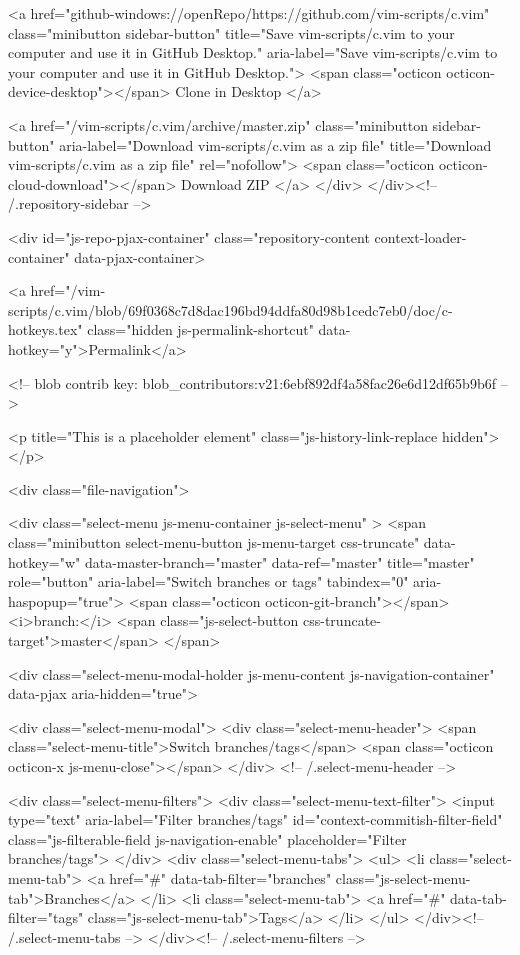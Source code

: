   <a href="github-windows://openRepo/https://github.com/vim-scripts/c.vim" class="minibutton sidebar-button" title="Save vim-scripts/c.vim to your computer and use it in GitHub Desktop." aria-label="Save vim-scripts/c.vim to your computer and use it in GitHub Desktop.">
    <span class="octicon octicon-device-desktop"></span>
    Clone in Desktop
  </a>

                <a href="/vim-scripts/c.vim/archive/master.zip"
                   class="minibutton sidebar-button"
                   aria-label="Download vim-scripts/c.vim as a zip file"
                   title="Download vim-scripts/c.vim as a zip file"
                   rel="nofollow">
                  <span class="octicon octicon-cloud-download"></span>
                  Download ZIP
                </a>
              </div>
        </div><!-- /.repository-sidebar -->

        <div id="js-repo-pjax-container" class="repository-content context-loader-container" data-pjax-container>
          


<a href="/vim-scripts/c.vim/blob/69f0368c7d8dac196bd94ddfa80d98b1cedc7eb0/doc/c-hotkeys.tex" class="hidden js-permalink-shortcut" data-hotkey="y">Permalink</a>

<!-- blob contrib key: blob_contributors:v21:6ebf892df4a58fac26e6d12df65b9b6f -->

<p title="This is a placeholder element" class="js-history-link-replace hidden"></p>

<div class="file-navigation">
  

<div class="select-menu js-menu-container js-select-menu" >
  <span class="minibutton select-menu-button js-menu-target css-truncate" data-hotkey="w"
    data-master-branch="master"
    data-ref="master"
    title="master"
    role="button" aria-label="Switch branches or tags" tabindex="0" aria-haspopup="true">
    <span class="octicon octicon-git-branch"></span>
    <i>branch:</i>
    <span class="js-select-button css-truncate-target">master</span>
  </span>

  <div class="select-menu-modal-holder js-menu-content js-navigation-container" data-pjax aria-hidden="true">

    <div class="select-menu-modal">
      <div class="select-menu-header">
        <span class="select-menu-title">Switch branches/tags</span>
        <span class="octicon octicon-x js-menu-close"></span>
      </div> <!-- /.select-menu-header -->

      <div class="select-menu-filters">
        <div class="select-menu-text-filter">
          <input type="text" aria-label="Filter branches/tags" id="context-commitish-filter-field" class="js-filterable-field js-navigation-enable" placeholder="Filter branches/tags">
        </div>
        <div class="select-menu-tabs">
          <ul>
            <li class="select-menu-tab">
              <a href="#" data-tab-filter="branches" class="js-select-menu-tab">Branches</a>
            </li>
            <li class="select-menu-tab">
              <a href="#" data-tab-filter="tags" class="js-select-menu-tab">Tags</a>
            </li>
          </ul>
        </div><!-- /.select-menu-tabs -->
      </div><!-- /.select-menu-filters -->


